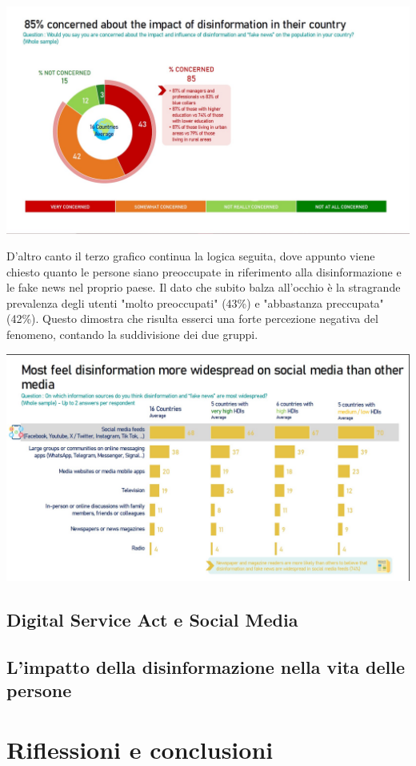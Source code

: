 \documentclass{article}
\begin{document}
\begin{justify}
\begin{center}
\includegraphics[width=0.5\linewidth]{Immagini/Grafico3.jpg}
\end{center}
    D'altro canto il terzo grafico continua la logica seguita, dove appunto viene chiesto quanto le persone siano preoccupate in riferimento alla disinformazione e le fake news nel proprio paese.
    Il dato che subito balza all'occhio è la stragrande prevalenza degli utenti "molto preoccupati" (43\%) e "abbastanza preccupata" (42\%). Questo dimostra che risulta esserci una forte percezione negativa del fenomeno, contando la suddivisione dei due gruppi.
    \end{justify}
\begin{center}
\includegraphics[width=0.5\linewidth]{Immagini/Grafico4.jpg}
\end{center}

\centering\newpage\subsection{Digital Service Act e Social Media}
\begin{justify}
    
\end{justify}
\centering\subsection{L'impatto della disinformazione nella vita delle persone}
\begin{justify}
    
\end{justify}
\centering
\newpage\section{Riflessioni e conclusioni}

\newpage

\end{document}
